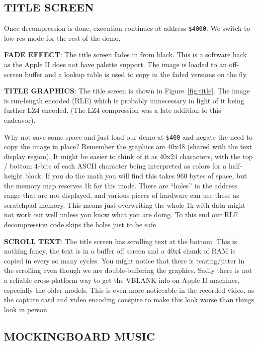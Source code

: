 \documentclass[twocolumn]{article}
\begin{document}
\subsection{TITLE SCREEN}

Once decompression is done, execution continues at address {\tt \$4000}.
We switch to low-res mode for the rest of the demo.

\noindent
{\bf FADE EFFECT}:
The title screen fades in from black.
This is a software hack as the Apple II does not have palette support.
The image is loaded to an off-screen buffer and a lookup table is used to
copy in the faded versions on the fly.

\noindent
{\bf TITLE GRAPHICS}:
The title screen is shown in Figure~\ref{fig:title}.
The image is run-length encoded (RLE) which is
probably unnecessary in light of it being further LZ4 encoded.
(The LZ4 compression was a late addition to this endeavor).

Why not save some space and just load our demo at {\tt \$400} and negate
the need
to copy the image in place?
Remember the graphics are 40x48 (shared with the text display region).
It might be easier to think of it as 40x24 characters, with the top / bottom
4-bits of each ASCII character being interpreted as colors for a half-height
block.
If you do the math you will find this takes 960 bytes of space, but the memory
map reserves 1k for this mode.
There are ``holes'' in the address range that are not displayed, and 
various pieces of hardware can use these as scratchpad memory.  
This means just overwriting the whole 1k with data might not work out well
unless you know what you are doing.
To this end our RLE decompression code skips the holes just to be safe.

\noindent
{\bf SCROLL TEXT}:
The title screen has scrolling text at the bottom.
This is nothing fancy, the text is in a buffer off screen and a 40x4 
chunk of RAM is copied in every so many cycles.
You might notice that there is tearing/jitter in the scrolling even
though we are double-buffering the graphics.  
Sadly there is not a reliable cross-platform way to get the VBLANK info 
on Apple II machines, especially the older models.
This is even more noticeable in the recorded video, as the capture card and
video encoding conspire to make this look worse than things look in person.

\subsection{MOCKINGBOARD MUSIC}
\end{document}

